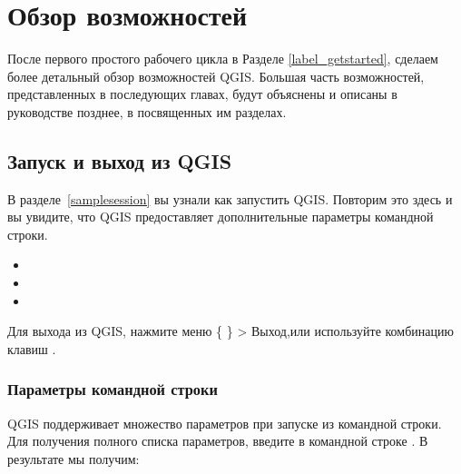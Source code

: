 
\chapter{Обзор возможностей}\label{feature_glance}


После первого простого рабочего цикла в Разделе \ref{label_getstarted},
сделаем более детальный обзор возможностей QGIS. Большая часть
возможностей, представленных в последующих главах, будут объяснены и
описаны в руководстве позднее, в посвященных им разделах.

\section{Запуск и выход из QGIS}\label{label_startinqgis}

В разделе~\ref{samplesession} вы узнали как запустить QGIS. Повторим это
здесь и вы увидите, что QGIS предоставляет дополнительные параметры
командной строки.

\begin{itemize}
\item {}
\item {}
\item {}
\end{itemize}

Для выхода из QGIS, нажмите меню \{\nix{} \} > Выход,или используйте
комбинацию клавиш .

\subsection{Параметры командной строки}
\label{label_commandline}

\nix QGIS поддерживает множество параметров при запуске из командной строки. Для получения полного
списка параметров, введите в командной строке . В результате мы получим:

